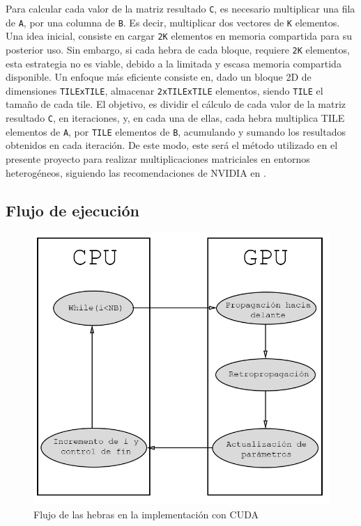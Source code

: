 Para calcular cada valor de la matriz resultado \texttt{C}, es necesario multiplicar una fila de \texttt{A}, por una columna de \texttt{B}. Es decir, multiplicar dos vectores de \texttt{K} elementos. Una idea inicial, consiste en cargar \texttt{2K} elementos en memoria compartida para su posterior uso. Sin embargo, si cada hebra de cada bloque, requiere \texttt{2K} elementos, esta estrategia no es viable, debido a la limitada y escasa memoria compartida disponible. Un enfoque más eficiente consiste en, dado un bloque 2D de dimensiones \texttt{TILExTILE}, almacenar \texttt{2xTILExTILE} elementos, siendo \texttt{TILE} el tamaño de cada tile. El objetivo, es dividir el cálculo de cada valor de la matriz resultado \texttt{C}, en iteraciones, y, en cada una de ellas, cada hebra multiplica TILE elementos de \texttt{A}, por \texttt{TILE} elementos de \texttt{B}, acumulando y sumando los resultados obtenidos en cada iteración. De este modo, este será el método utilizado en el presente proyecto para realizar multiplicaciones matriciales en entornos heterogéneos, siguiendo las recomendaciones de NVIDIA en \cite{nvidia_mult_matrix_v4}. \\


\subsection{Flujo de ejecución}

\begin{figure}[H]
	\centering
	\includegraphics[width=0.8\linewidth]{imagenes/esquema_cpu_gpu.jpg} 
	\caption{Flujo de las hebras en la implementación con CUDA}
	\label{fig:cpu_gpu}
\end{figure}

